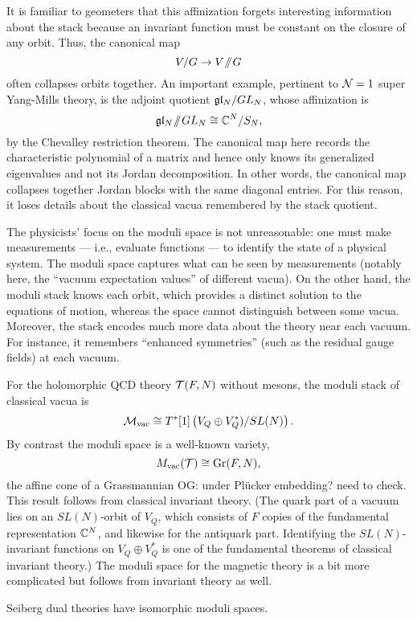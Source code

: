 \documentclass[11pt]{amsart}
\def\owen#1{{\textcolor{violet!65!black}{OG: {#1}}}}
\begin{document}
It is familiar to geometers that this affinization forgets interesting information about the stack because an invariant function must be constant on the closure of any orbit.
Thus, the canonical map
\[
V/G \to V\!\sslash\! G
\]
often collapses orbits together.
An important example, pertinent to $\mathcal N =1$ super Yang-Mills theory, is the adjoint quotient $\mathfrak{g} \mathfrak{l}_N/ GL_N$, whose affinization is
\[
\mathfrak{g} \mathfrak{l}_N \!\sslash\! GL_N \cong \mathbb C^N/S_N,
\]
by the Chevalley restriction theorem.
The canonical map here records the characteristic polynomial of a matrix and hence only knows its generalized eigenvalues and not its Jordan decomposition.
In other words, the canonical map collapses together Jordan blocks with the same diagonal entries.
For this reason, it loses details about the classical vacua remembered by the stack quotient.

\begin{rmk}
The physicists' focus on the moduli space is not unreasonable:
one must make measurements --- i.e., evaluate functions --- to identify the state of a physical system.
The moduli space captures what can be seen by measurements (notably here, the ``vacuum expectation values'' of different vacua).
On the other hand, the moduli stack knows each orbit, which provides a distinct solution to the equations of motion, whereas the space cannot distinguish between some vacua.
Moreover, the stack encodes much more data about the theory near each vacuum.
For instance, it remembers ``enhanced symmetries'' (such as the residual gauge fields) at each vacuum.
\end{rmk}

For the holomorphic QCD theory $\mathcal T(F,N)$ without mesons, 
the moduli stack of classical vacua is 
\[
\mathcal M_{\rm vac} \cong T^*[1] \left(V_Q \oplus V_Q^*)/SL(N)\right).
\]
By contrast the moduli space is a well-known variety, 
\[
M_{\rm vac}(\mathcal T) \cong {\rm Gr}(F, N),
\]
the affine cone of a Grassmannian \owen{under Pl\"ucker embedding? need to check.} 
This result follows from classical invariant theory.
(The quark part of a vacuum lies on an $SL(N)$-orbit of $V_Q$, which consists of $F$ copies of the fundamental representation $\mathbb C^N$, and likewise for the antiquark part.
Identifying the $SL(N)$-invariant functions on $V_Q \oplus V^*_Q$ is one of the fundamental theorems of classical invariant theory.)
The moduli space for the magnetic theory is a bit more complicated but follows from invariant theory as well.

\begin{prop}
Seiberg dual theories have isomorphic moduli spaces.
\end{prop}
\end{document}
